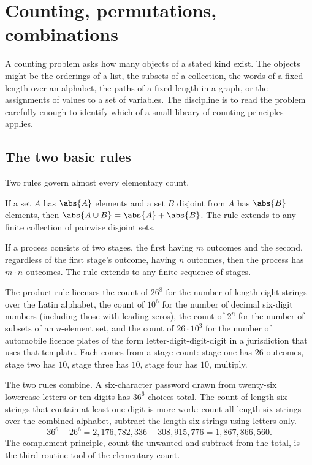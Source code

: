 \section{Counting, permutations, combinations}

A counting problem asks how many objects of a stated kind exist.
The objects might be the orderings of a list, the subsets of a
collection, the words of a fixed length over an alphabet, the paths
of a fixed length in a graph, or the assignments of values to a set
of variables. The discipline is to read the problem carefully
enough to identify which of a small library of counting principles
applies.

\subsection{The two basic rules}

Two rules govern almost every elementary count.

\begin{principle}
If a set $A$ has $\abs{A}$ elements and a set $B$ disjoint from $A$
has $\abs{B}$ elements, then $\abs{A \cup B} = \abs{A} + \abs{B}$.
The rule extends to any finite collection of pairwise disjoint sets.
\end{principle}

\begin{principle}
If a process consists of two stages, the first having $m$ outcomes
and the second, regardless of the first stage's outcome, having $n$
outcomes, then the process has $m \cdot n$ outcomes. The rule
extends to any finite sequence of stages.
\end{principle}

The product rule licenses the count of $26^{8}$ for the number of
length-eight strings over the Latin alphabet, the count of $10^{6}$
for the number of decimal six-digit numbers (including those with
leading zeros), the count of $2^{n}$ for the number of subsets of
an $n$-element set, and the count of $26 \cdot 10^{3}$ for the
number of automobile licence plates of the form letter-digit-digit-digit
in a jurisdiction that uses that template. Each comes from a stage
count: stage one has $26$ outcomes, stage two has $10$, stage three
has $10$, stage four has $10$, multiply.

The two rules combine. A six-character password drawn from twenty-six
lowercase letters or ten digits has $36^{6}$ choices total. The
count of length-six strings that contain at least one digit is more
work: count all length-six strings over the combined alphabet,
subtract the length-six strings using letters only.
\[
36^{6} - 26^{6} = 2{,}176{,}782{,}336 - 308{,}915{,}776 =
1{,}867{,}866{,}560.
\]
The complement principle, count the unwanted and subtract from the
total, is the third routine tool of the elementary count.

